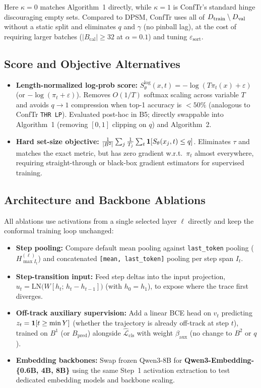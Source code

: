 \documentclass[10pt,a4paper]{article}
\newcommand{\Lcls}{\widehat{\mathcal L}_{\mathrm{cls}}}
\begin{document}
\noindent Here $\kappa=0$ matches Algorithm~1 directly, while $\kappa=1$ is ConfTr's standard hinge discouraging empty sets. Compared to DPSM, ConfTr uses all of $D_{\mathrm{train}}\setminus D_{\mathrm{val}}$ without a static split and eliminates $q$ and $\gamma$ (no pinball lag), at the cost of requiring larger batches ($|B_{\mathrm{cal}}|\ge 32$ at $\alpha=0.1$) and tuning $\varepsilon_{\mathrm{sort}}$.

\subsection{Score and Objective Alternatives}
\begin{itemize}
\item \textbf{Length-normalized log-prob score:} $S_\theta^{\mathrm{log}}(x,t) = -\log(T\pi_t(x)+\varepsilon)$ (or $-\log(\pi_t+\varepsilon)$). Removes $O(1/T)$ softmax scaling across variable $T$ and avoids $q\to 1$ compression when top-1 accuracy is $<50\%$ (analogous to ConfTr \texttt{THR LP}). Evaluated post-hoc in B5; directly swappable into Algorithm~1 (removing $[0,1]$ clipping on $q$) and Algorithm~2.
\item \textbf{Hard set-size objective:} $\frac{1}{|B^2|}\sum_{j}\frac{1}{T_j}\sum_{t}\mathbf{1}[S_\theta(x_j,t)\le q]$. Eliminates $\tau$ and matches the exact metric, but has zero gradient w.r.t.\ $\pi_t$ almost everywhere, requiring straight-through or black-box gradient estimators for supervised training.
\end{itemize}

\subsection{Architecture and Backbone Ablations}
All ablations use activations from a single selected layer $\ell$ directly and keep the conformal training loop unchanged:
\begin{itemize}
\item \textbf{Step pooling:} Compare default mean pooling against \texttt{last\_token} pooling ($H_{\max I_t}^{(\ell)}$) and concatenated \texttt{[mean, last\_token]} pooling per step span $I_t$.
\item \textbf{Step-transition input:} Feed step deltas into the input projection, $u_t = \mathrm{LN}\big(W[h_t;\, h_t - h_{t-1}]\big)$ (with $h_0 = h_1$), to expose where the trace first diverges.
\item \textbf{Off-track auxiliary supervision:} Add a linear BCE head on $v_t$ predicting $z_t = \mathbf{1}[t \ge \min Y]$ (whether the trajectory is already off-track at step $t$), trained on $B^1$ (or $B_{\mathrm{pred}}$) alongside $\Lcls$ with weight $\beta_{\mathrm{aux}}$ (no change to $B^2$ or $q$).
\item \textbf{Embedding backbones:} Swap frozen Qwen3-8B for \textbf{Qwen3-Embedding-\{0.6B, 4B, 8B\}} using the same Step~1 activation extraction to test dedicated embedding models and backbone scaling.
\end{itemize}
\end{document}

